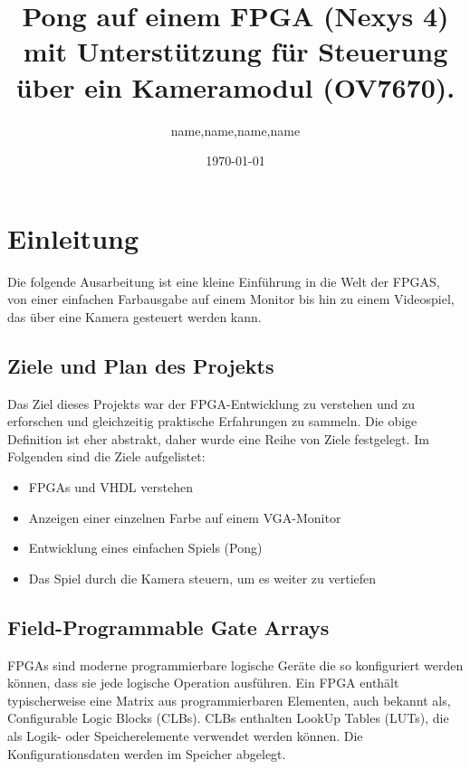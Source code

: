 \documentclass[a4paper, 11pt]{article}
\begin{document}
\title{Pong auf einem FPGA (Nexys 4) mit Unterstützung für Steuerung über ein Kameramodul (OV7670).}
\author{name,name,name,name}
\date{\today{}}

\maketitle                                      
\tableofcontents

\newpage
\section{Einleitung} Die folgende Ausarbeitung ist eine kleine Einführung in die Welt der FPGAS, von einer einfachen Farbausgabe auf einem Monitor bis hin zu einem Videospiel, das über eine Kamera gesteuert werden kann.   
    

\subsection{Ziele und Plan des Projekts}                             

    Das Ziel dieses Projekts war der FPGA-Entwicklung zu verstehen und zu erforschen und gleichzeitig praktische Erfahrungen zu sammeln. Die obige Definition ist eher abstrakt, daher wurde eine Reihe von Ziele festgelegt. Im Folgenden sind die Ziele aufgelistet:
    \begin{itemize}
        \item FPGAs und VHDL verstehen
        \item Anzeigen einer einzelnen Farbe auf einem VGA-Monitor
        \item Entwicklung eines einfachen Spiels (Pong)
        \item Das Spiel durch die Kamera steuern, um es weiter zu vertiefen
    \end{itemize}

\subsection{Field-Programmable Gate Arrays}

    FPGAs sind moderne programmierbare logische Geräte die so konfiguriert werden können, dass sie jede logische Operation ausführen. Ein FPGA enthält typischerweise eine Matrix aus programmierbaren Elementen, auch bekannt als, Configurable Logic  Blocks (CLBs).  CLBs enthalten LookUp Tables (LUTs), die als Logik- oder Speicherelemente verwendet werden können.   Die Konfigurationsdaten werden im Speicher abgelegt.
    
\end{document}
